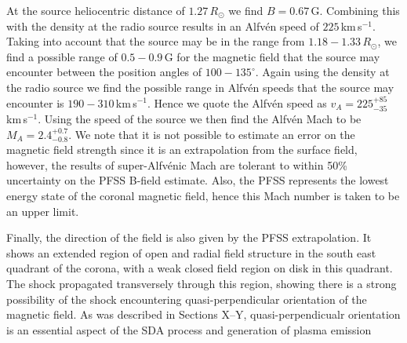 At the source heliocentric distance of $1.27\,R_{\odot}$ we find $B=0.67$\,G. Combining this with the density at the radio source results in an Alfv\'{e}n speed of $225$\,km\,s$^{-1}$. 
Taking into account that the source may be in the range from $1.18-1.33\,R_{\odot}$, we find a possible range of $0.5-0.9$\,G for the magnetic field that the source may encounter between the position angles of $100-135^{\circ}$. Again using the density at the radio source we find the possible range in Alfv\'{e}n speeds that the source may encounter is $190-310$\,km\,s$^{-1}$. Hence we quote the Alfv\'{e}n speed as $v_A=225^{+85}_{-35}$\,km\,s$^{-1}$. Using the speed of the source we then find the Alfv\'{e}n Mach to be $M_A =2.4^{+0.7}_{-0.8}$. We note that it is not possible to estimate an error on the magnetic field strength since it is an extrapolation from the surface field, however, the results of super-Alfv\'{e}nic Mach are tolerant to within 50\% uncertainty on the PFSS B-field estimate. Also, the PFSS represents the lowest energy state of the coronal magnetic field, hence this Mach number is taken to be an upper limit.

Finally, the direction of the field is also given by the PFSS extrapolation. It shows an extended region of open and radial field structure in the south east quadrant of the corona, with a weak closed field region on disk in this quadrant. The shock propagated transversely through this region, showing there is a strong possibility of the shock encountering quasi-perpendicular orientation of the magnetic field. As was described in Sections X--Y, quasi-perpendicualr orientation is an essential aspect of the SDA process and generation of plasma emission


